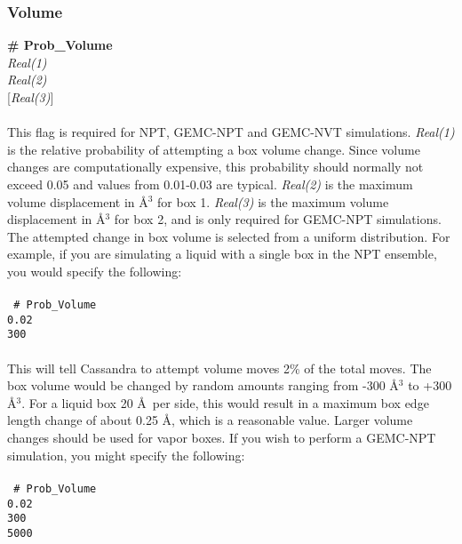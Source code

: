\subsubsection{Volume}
{\bf \# Prob\_Volume} \\
{\it Real(1)} \\ 
{\it Real(2)} \\
{[}{\it Real(3)}] \\ \\
%
This flag is required for NPT, GEMC-NPT and GEMC-NVT simulations. 
{\it Real(1)} is the relative probability of attempting a box volume change. 
Since volume changes are computationally expensive, this probability should 
normally not exceed 0.05 and values from 0.01-0.03 are typical. 
{\it Real(2)} is the maximum volume displacement in \AA$^3$ for box 1.
{\it Real(3)} is the maximum volume displacement in \AA$^3$ for box 2, 
and is only required for GEMC-NPT simulations.
The attempted change in box volume is selected from a uniform distribution. 
%
For example, if you are simulating a liquid with a single box in the NPT ensemble,
you would specify the following: \\ \\ 
%                                                                                                                                            
\texttt{
\# Prob\_Volume \\
0.02 \\
300} \\ \\
%                                                                                                                                           
This will tell Cassandra to attempt volume moves 2\% of the
total moves. The box volume would be changed by random amounts ranging from
-300 \AA$^3$ to +300 \AA$^3$. For a liquid box 20 \AA\ per side,
this would result in a maximum box edge length change of about 0.25
\AA, which is a reasonable value.  
Larger volume changes should be used for vapor boxes. 
%
If you wish to perform a GEMC-NPT simulation, you might specify the
following: \\ \\ 
%                                                                                                                                           
\texttt{
\# Prob\_Volume \\
0.02 \\
300 \\
5000} \\ \\
